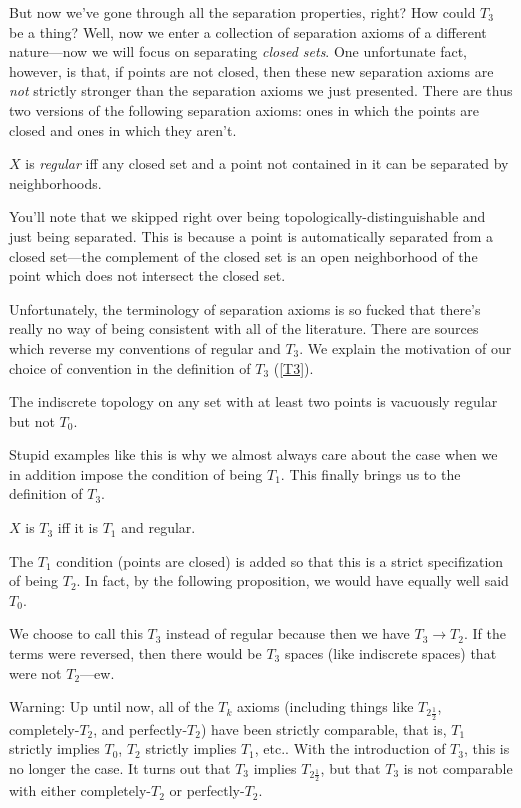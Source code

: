 But now we've gone through all the separation properties, right?  How could $T_3$ be a thing?  Well, now we enter a collection of separation axioms of a different nature---now we will focus on separating \emph{closed sets}.  One unfortunate fact, however, is that, if points are not closed, then these new separation axioms are \emph{not} strictly stronger than the separation axioms we just presented.  There are thus two versions of the following separation axioms:  ones in which the points are closed and ones in which they aren't.
\begin{dfn}[Regular]\label{Regular}
$X$ is \emph{regular} iff any closed set and a point not contained in it can be separated by neighborhoods.
\begin{rmk}
You'll note that we skipped right over being topologically-distinguishable and just being separated.  This is because a point is automatically separated from a closed set---the complement of the closed set is an open neighborhood of the point which does not intersect the closed set.
\end{rmk}
\begin{rmk}
Unfortunately, the terminology of separation axioms is so fucked that there's really no way of being consistent with all of the literature.  There are sources which reverse my conventions of regular and $T_3$.  We explain the motivation of our choice of convention in the definition of $T_3$ (\cref{T3}).
\end{rmk}
\end{dfn}
\begin{exm}
The indiscrete topology on any set with at least two points is vacuously regular but not $T_0$.
\end{exm}
Stupid examples like this is why we almost always care about the case when we in addition impose the condition of being $T_1$.  This finally brings us to the definition of $T_3$.
\begin{dfn}[$T_3$]\label{T3}
$X$ is $T_3$ iff it is $T_1$ and regular.
\begin{rmk}
The $T_1$ condition (points are closed) is added so that this is a strict specifization of being $T_2$.  In fact, by the following proposition, we would have equally well said $T_0$.
\end{rmk}
\begin{rmk}
We choose to call this $T_3$ instead of regular because then we have $T_3\rightarrow T_2$.  If the terms were reversed, then there would be $T_3$ spaces (like indiscrete spaces) that were not $T_2$---ew.
\end{rmk}
\begin{rmk}
Warning:  Up until now, all of the $T_k$ axioms (including things like $T_{2\frac{1}{2}}$, completely-$T_2$, and perfectly-$T_2$) have been strictly comparable, that is, $T_1$ strictly implies $T_0$, $T_2$ strictly implies $T_1$, etc..  With the introduction of $T_3$, this is no longer the case.  It turns out that $T_3$ implies $T_{2\frac{1}{2}}$, but that $T_3$ is not comparable with either completely-$T_2$ or perfectly-$T_2$.
\end{rmk}
\end{dfn}
